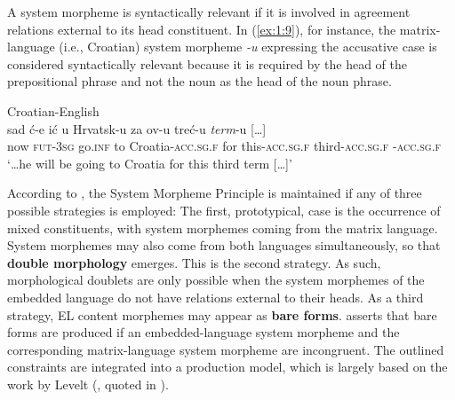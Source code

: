\noindent A system morpheme is syntactically relevant if it is involved in agreement relations external to its head constituent. In (\ref{ex:1:9}), for instance, the matrix-language (i.e., Croatian) system morpheme \textit{-u} expressing the accusative case is considered  syntactically relevant because it is required by the head of the prepositional phrase and not the noun as the head of the noun phrase.

\ea{\label{ex:1:9}}
Croatian-English \citep[115]{hlavac-second-generation-2003}\\
\gll {\dots} sad ć-e ić u Hrvatsk-u za ov-u treć-u \textit{term}-u [{\dots}]\\
	{} now \textsc{fut-3sg} go.\textsc{inf} to Croatia-\textsc{acc.sg.f} for this-\textsc{acc.sg.f} third-\textsc{acc.sg.f} \phantom{term}-\textsc{acc.sg.f}\\
\glt `\dots he will be going to Croatia for this third term [\dots]'
\z

According to \citet[110]{myers-scotton-duelling-1993}, the System Morpheme Principle is maintained if any of three possible strategies is employed: The first, prototypical, case is the occurrence of mixed constituents, with system morphemes coming from the matrix language. System morphemes may also come from both languages simultaneously, so that \textbf{double morphology} emerges. This is the second strategy. As such, morphological doublets are only possible when the system morphemes of the embedded language do not have relations external to their heads. As a third strategy, EL content morphemes may appear as \textbf{bare forms}. \citet[112]{myers-scotton-duelling-1993} asserts that bare forms are produced if an embedded-language system morpheme and the corresponding matrix-language system morpheme are incongruent. The outlined constraints are integrated into a production model, which is largely based on the work by Levelt (\citeyear{levelt89}, quoted in \citealt[][]{myers-scotton-duelling-1993}).

